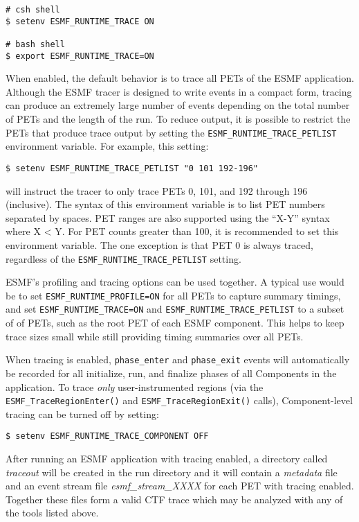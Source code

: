 \begin{verbatim}
# csh shell
$ setenv ESMF_RUNTIME_TRACE ON

# bash shell
$ export ESMF_RUNTIME_TRACE=ON
\end{verbatim}

When enabled, the default behavior is to trace all PETs of the
ESMF application. Although the ESMF tracer is designed to write
events in a compact form, tracing can produce an extremely
large number of events depending on the total number of PETs and
the length of the run. To reduce output, it is possible to restrict
the PETs that produce trace output by setting the {\tt ESMF\_RUNTIME\_TRACE\_PETLIST}
environment variable. For example, this setting:

\begin{verbatim}
$ setenv ESMF_RUNTIME_TRACE_PETLIST "0 101 192-196"
\end{verbatim}

will instruct the tracer to only trace PETs 0, 101, and 192 through 196
(inclusive). The syntax of this environment variable is to list
PET numbers separated by spaces. PET ranges are also supported using
the ``X-Y'' syntax where X < Y. For PET counts greater than 100, it is
recommended to set this environment variable. The one exception is that
PET 0 is always traced, regardless of the {\tt ESMF\_RUNTIME\_TRACE\_PETLIST}
setting.

ESMF's profiling and tracing options can be used together.  A typical
use would be to set {\tt ESMF\_RUNTIME\_PROFILE=ON} for all PETs to
capture summary timings, and set {\tt ESMF\_RUNTIME\_TRACE=ON} and
{\tt ESMF\_RUNTIME\_TRACE\_PETLIST} to a subset of of PETs,
such as the root PET of each ESMF component. This helps to keep trace
sizes small while still providing timing summaries over all PETs.

When tracing is enabled, {\tt phase\_enter} and {\tt phase\_exit} events will
automatically be recorded for all initialize, run, and finalize phases of all
Components in the application. To trace {\em only} user-instrumented regions (via
the {\tt ESMF\_TraceRegionEnter()} and {\tt ESMF\_TraceRegionExit()} calls),
Component-level tracing can be turned off by setting:

\begin{verbatim}
$ setenv ESMF_RUNTIME_TRACE_COMPONENT OFF
\end{verbatim}

After running an ESMF application with tracing enabled, a directory
called {\em traceout} will be created in the run directory and it will
contain a {\em metadata} file and an event stream file {\em esmf\_stream\_XXXX}
for each PET with tracing enabled. Together these files form a valid
CTF trace which may be analyzed with any of the tools listed above.

